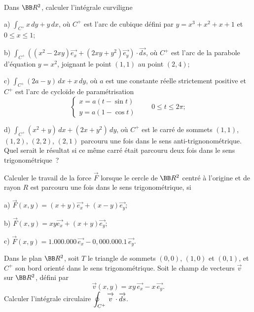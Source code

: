 \documentclass[12pt,french,oneside,a4paper]{memoir} %
\begin{document}
\begin{exo}
Dans $\BB R^2$, calculer l'intégrale curviligne

a) $\displaystyle{\int_{C^+}x\,dy+y\,dx}$, \quad où $C^+$ est l'arc
de cubique défini par $y=x^3+x^2+x+1$ et $0\leq x\leq 1$;

b) $\displaystyle{\int_{C^+}\left((x^2-2xy)\overrightarrow{e_x}+(2xy+y^2)
\overrightarrow{e_y}\right)\cdot\overrightarrow{ds}}$, \quad où $C^+$
est l'arc de la parabole d'équation $y=x^2$, joignant le point
$(1,1)$ au point $(2,4)$;

c) $\displaystyle{\int_{C^+}(2a-y)\,dx+x\,dy}$, \quad où $a$ est
une constante réelle strictement positive et $C^+$ est l'arc de
cycloïde de paramétrisation
\begin{equation*}
\left\{
\begin{array}{l}
x=a(t-\sin t)\\[2mm]
y=a(1-\cos t)
\end{array}
\right.
\qquad 0\leq t\leq 2\pi;
\end{equation*}

d) $\displaystyle{\int_{C^+}(x^2+y)\,dx+(2x+y^2)\,dy}$, \quad où
$C^+$ est le carré de sommets $(1,1)$, $(1,2)$, $(2,2)$, $(2,1)$
parcouru une fois dans le sens anti-trignonométrique. Quel serait
le résultat si ce même carré était parcouru deux fois dans
le sens trigonométrique~?
\end{exo}
\begin{exo}
Calculer le travail de la force $\overrightarrow F$ lorsque le
cercle de $\BB R^2$ centré à l'origine et de rayon $R$ est
parcouru une fois dans le sens trigonométrique, si

a) $\overrightarrow
F(x,y)=(x+y)\overrightarrow{e_x}+(x-y)\overrightarrow{e_y}$;

b) $\overrightarrow
F(x,y)=xy\overrightarrow{e_x}+(x+y)\overrightarrow{e_y}$;

c) $\overrightarrow
F(x,y)=1.000.000\,\overrightarrow{e_x}-0,000.000.1\,
\overrightarrow{e_y}$.
\end{exo}

\begin{exo}
Dans le plan $\BB R^2$, soit $T$ le triangle de sommets
$(0,0)$, $(1,0)$ et $(0,1)$, et $C^+$ son bord orienté dans le
sens trigonométrique. Soit le champ de vecteurs  $\overrightarrow
v$ sur $\BB R^2$, défini par
\begin{equation*}
 \overrightarrow v(x,y)=xy\,\overrightarrow{e_x}-x\,
\overrightarrow{e_y}.
\end{equation*}
Calculer l'intégrale circulaire $\displaystyle{\oint_{C^+}
 \overrightarrow{\mathstrut
v}\cdot\overrightarrow{\mathstrut{ds}}}$.
\end{exo}
\end{document}

